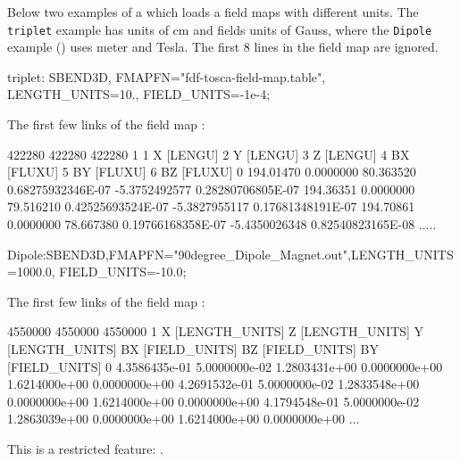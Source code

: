 Below two examples of a  which loads a field maps with different units. The \texttt{triplet} example has units of cm and fields units
of Gauss, where the \texttt{Dipole} example () uses meter and Tesla. The first 8 lines in the field map are ignored.

\begin{example}
triplet: SBEND3D, FMAPFN="fdf-tosca-field-map.table", LENGTH_UNITS=10., FIELD_UNITS=-1e-4;
\end{example}

The first few links of the field map :

\begin{example}
      422280      422280      422280           1
 1 X [LENGU]
 2 Y [LENGU]
 3 Z [LENGU]
 4 BX [FLUXU]
 5 BY [FLUXU]
 6 BZ [FLUXU]
 0
 194.01470 0.0000000 80.363520 0.68275932346E-07 -5.3752492577 0.28280706805E-07
 194.36351 0.0000000 79.516210 0.42525693524E-07 -5.3827955117 0.17681348191E-07
 194.70861 0.0000000 78.667380 0.19766168358E-07 -5.4350026348 0.82540823165E-08
.....
\end{example}

\begin{example}
Dipole:SBEND3D,FMAPFN="90degree_Dipole_Magnet.out",LENGTH_UNITS=1000.0, FIELD_UNITS=-10.0;
\end{example}
The first few links of the field map :
\begin{example}
	4550000	4550000	4550000	1
X [LENGTH_UNITS]
Z [LENGTH_UNITS]
Y [LENGTH_UNITS]
BX [FIELD_UNITS]
BZ [FIELD_UNITS]
BY [FIELD_UNITS]
0
4.3586435e-01   5.0000000e-02   1.2803431e+00   0.0000000e+00   1.6214000e+00   0.0000000e+00
4.2691532e-01   5.0000000e-02   1.2833548e+00   0.0000000e+00   1.6214000e+00   0.0000000e+00
4.1794548e-01   5.0000000e-02   1.2863039e+00   0.0000000e+00   1.6214000e+00   0.0000000e+00
...
\end{example}


This is a restricted feature: \opalcycl.

